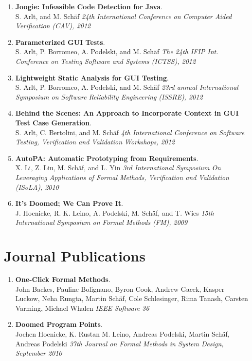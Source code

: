 \begin{enumerate}
  \item \textbf{Joogie: Infeasible Code Detection for Java}.
  \\  S. Arlt, and M. Schäf
  \emph{24th International Conference on Computer Aided Verification (CAV), 2012}

  \item \textbf{Parameterized GUI Tests}.
  \\  S. Arlt, P. Borromeo, A. Podelski, and M. Schäf
  \emph{The 24th IFIP Int. Conference on Testing Software and Systems (ICTSS), 2012}

  \item \textbf{Lightweight Static Analysis for GUI Testing}.
  \\  S. Arlt, P. Borromeo, A. Podelski, and M. Schäf
  \emph{23rd annual International Symposium on Software Reliability Engineering (ISSRE), 2012}

  \item \textbf{Behind the Scenes: An Approach to Incorporate Context in GUI Test Case Generation}.
  \\  S. Arlt, C. Bertolini, and M. Schäf
  \emph{4th International Conference on Software Testing, Verification and Validation Workshops, 2012}

  \item \textbf{AutoPA: Automatic Prototyping from Requirements}.
  \\  X. Li, Z. Liu, M. Schäf, and L. Yin
  \emph{3rd International Symposium On Leveraging Applications of Formal Methods, Verification and Validation (ISoLA), 2010}

  \item \textbf{It's Doomed; We Can Prove It}.
  \\  J. Hoenicke, R. K. Leino, A. Podelski, M. Schäf, and T. Wies
  \emph{15th International Symposium on Formal Methods (FM), 2009}

  \setcounter{saveenum}{\value{enumi}}
\end{enumerate}



\section{\sc Journal Publications}

\begin{enumerate} \setcounter{enumi}{\value{saveenum}}

\item \textbf{One-Click Formal Methods}.
\\ John Backes, Pauline Bolignano, Byron Cook, Andrew Gacek, Kasper Luckow, Neha Rungta, Martin Schäf, Cole Schlesinger, Rima Tanash, Carsten Varming, Michael Whalen
\emph{IEEE Software 36}

\item \textbf{Doomed Program Points}.
\\ Jochen Hoenicke, K. Rustan M. Leino, Andreas Podelski, Martin Schäf, Andreas Podelski
\emph{37th Journal on Formal Methods in System Design, September 2010}

\setcounter{saveenum}{\value{enumi}}
\end{enumerate}


